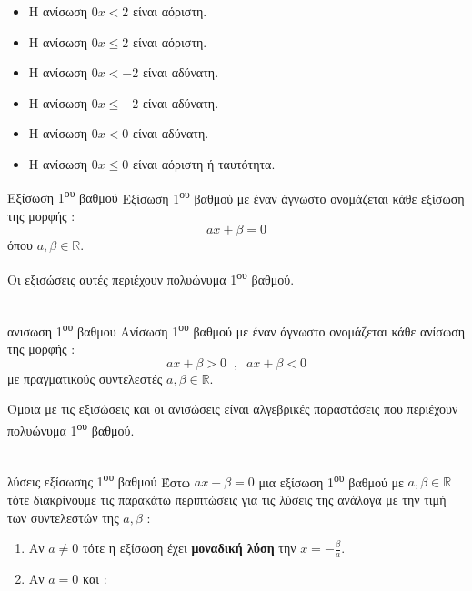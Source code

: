 \begin{multicols}{2}
\begin{itemize}
\item Η ανίσωση $ 0x<2 $ είναι αόριστη.
\item Η ανίσωση $ 0x\leq2 $ είναι αόριστη.
\item Η ανίσωση $ 0x<-2 $ είναι αδύνατη.
\item Η ανίσωση $ 0x\leq-2 $ είναι αδύνατη.
\item Η ανίσωση $ 0x<0 $ είναι αδύνατη.
\item Η ανίσωση $ 0x\leq 0 $ είναι αόριστη ή ταυτότητα.
\end{itemize}
\end{multicols}
\begin{orismos}{Εξίσωση 1\textsuperscript{\MakeLowercase{ου}} βαθμού}
Εξίσωση 1\textsuperscript{ου} βαθμού με έναν άγνωστο ονομάζεται κάθε εξίσωση της μορφής :
\[ ax+\beta=0 \]
όπου $ a,\beta\in\mathbb{R} $.
\end{orismos}
Oι εξισώσεις αυτές περιέχουν πολυώνυμα 1\textsuperscript{ου} βαθμού.\\\\
\begin{orismos}{ανισωση 1\textsuperscript{\MakeLowercase{ου}} βαθμου}
Ανίσωση 1\textsuperscript{ου} βαθμού με έναν άγνωστο ονομάζεται κάθε ανίσωση της μορφής :
\[ ax+\beta>0\;\;,\;\;ax+\beta<0 \] με πραγματικούς συντελεστές $ a,\beta\in\mathbb{R} $.
\end{orismos}
Όμοια με τις εξισώσεις και οι ανισώσεις είναι αλγεβρικές παραστάσεις που περιέχουν πολυώνυμα 1\textsuperscript{ου} βαθμού.\\\\
\thewrhmata
\begin{thewrhma}{
λύσεις εξίσωσης 1\textsuperscript{\MakeLowercase{ου}} βαθμού}
Έστω $ ax+\beta=0 $ μια εξίσωση 1\textsuperscript{ου} βαθμού με $ a,\beta\in\mathbb{R} $ τότε διακρίνουμε τις παρακάτω περιπτώσεις για τις λύσεις της ανάλογα με την τιμή των συντελεστών της $ a,\beta $ :
\begin{enumerate}
\item Αν $ a\neq0 $ τότε η εξίσωση έχει \textbf{μοναδική λύση} την $ x=-\frac{\beta}{a} $.
\item Αν $ a=0 $ και :
\end{enumerate}
\end{thewrhma}
